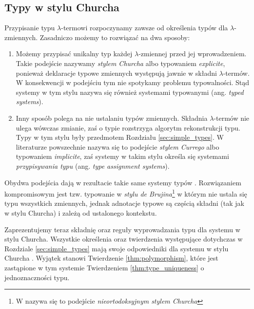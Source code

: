 \subsection{Typy w stylu Churcha}\label{subsec:church_style}
Przypisanie typu \(\lambda\)-termowi rozpoczynamy zawsze od określenia typów dla \(\lambda\)-zmiennych. Zasadniczo możemy to rozwiązać na dwa sposoby:

\begin{enumerate}
  \item Możemy przypisać unikalny typ każdej \(\lambda\)-zmiennej przed jej wprowadzeniem. Takie podejście nazywamy \emph{stylem Churcha} albo typowaniem \emph{explicite}, ponieważ deklaracje typowe zmiennych występują jawnie w składni \(\lambda\)-termów. W konsekwencji w podejściu tym nie spotykamy problemu typowalności. Stąd systemy w tym stylu nazywa się również systemami {typowanymi} (ang. \emph{typed systems}).
  \item Inny sposób polega na nie ustalaniu typów zmiennych. Składnia \(\lambda\)-termów nie ulega wówczas zmianie, zaś o typie rozstrzyga algorytm rekonstrukcji typu. Typy w tym stylu były przedmotem Rozdziału \ref{sec:simple_types}. W literaturze powszechnie nazywa się to podejście \emph{stylem Currego} albo typowaniem \emph{implicite}, zaś systemy w takim stylu określa się systemami \emph{przypisywania typu} (ang. \emph{type assignment systems}).
\end{enumerate}

Obydwa podejścia dają w rezultacie takie same systemy typów \cite[Rozdział 3.4]{Urzyczyn2006}.  %
Rozwiązaniem kompromisowym jest tzw. typowanie w \emph{stylu de Brujina}\footnote{W \cite{Urzyczyn2006} nazywa się to podejście \emph{nieortodoksyjnym stylem Churcha}} \cite[1A.33]{barendregt_dekkers_statman_2013} w którym nie ustala się typu wszystkich zmiennych, jednak adnotacje typowe są częścią składni (tak jak w stylu Churcha) i zależą od ustalonego kontekstu. 

Zaprezentujemy teraz składnię oraz reguły wyprowadzania typu dla systemu w stylu Churcha. Wszystkie określenia oraz twierdzenia występujące dotychczas w Rozdziale \ref{sec:simple_types} mają swoje odpowiedniki dla systemu w stylu Churcha \cite[Rozdział 2.10]{nederpelt_geuvers_2014}. Wyjątek stanowi Twierdzenie \ref{thm:polymorphism}, które jest zastąpione w tym systemie Twierdzeniem \ref{thm:type_uniqueness} o jednoznaczności typu.

